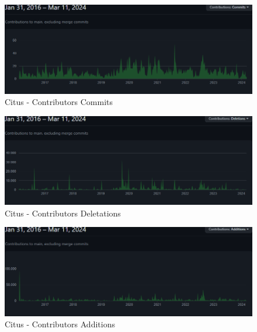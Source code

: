 \begin{flushleft}
    \begin{figure}[H]
        \centering
        \includegraphics[width=0.75\linewidth]{source/implementation/evaluation/postgresql_ha_solutions/insights/stackgres_citus/contributors_commits_citusdata_citus}
        \caption{Citus - Contributors Commits}
        \label{fig:contributors_commits_citusdata_citus}
    \end{figure}
    \begin{figure}[H]
        \centering
        \includegraphics[width=0.75\linewidth]{source/implementation/evaluation/postgresql_ha_solutions/insights/stackgres_citus/contributors_deletations_citusdata_citus}
        \caption{Citus - Contributors Deletations}
        \label{fig:contributors_deletations_citusdata_citus}
    \end{figure}
    \begin{figure}[H]
        \centering
        \includegraphics[width=0.75\linewidth]{source/implementation/evaluation/postgresql_ha_solutions/insights/stackgres_citus/contributors_additions_citusdata_citus}
        \caption{Citus - Contributors Additions}
        \label{fig:contributors_additions_citusdata_citus}
    \end{figure}


\end{flushleft}

